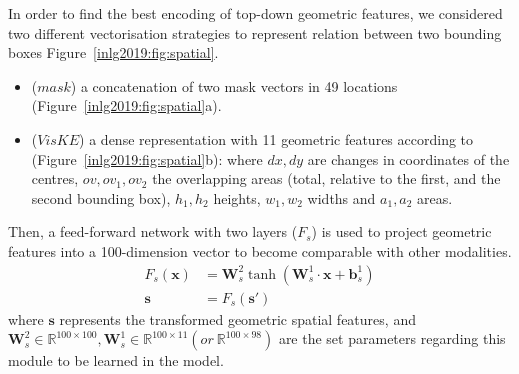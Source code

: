 In order to find the best encoding of top-down geometric features, we considered two different vectorisation strategies to represent relation between two bounding boxes Figure~\ref{inlg2019:fig:spatial}.
\begin{itemize}[noitemsep]
	\item ($mask$) a concatenation of two mask vectors in 49 locations (Figure~\ref{inlg2019:fig:spatial}a).
	\item ($VisKE$) a dense representation with 11 geometric features according to \cite{sadeghi2015viske}  (Figure~\ref{inlg2019:fig:spatial}b): where $dx, dy$ are changes in coordinates of the centres, $ov, ov_1, ov_2$ the overlapping areas (total, relative to the first, and the second bounding box), $h_1, h_2$ heights, $w_1, w_2$ widths and $a_1, a_2$ areas.
\end{itemize}
Then, a feed-forward network with two layers ($F_s$) is used to project geometric features into a 100-dimension vector to become comparable with other modalities. %
\begin{align*}
F_s(\bm{x}) &= \bm{W}_{s}^2 \tanh(\bm{W}_{s}^1 \cdot \bm{x} + \bm{b}_{s}^1) \\
\bm{s} &= F_s(\bm{s}')
\end{align*}
\noindent where $\bm{s}$ represents the transformed geometric spatial features, and $\bm{W}_{s}^2 \in \mathbb{R}^{100 \times 100}, \bm{W}_{s}^1 \in \mathbb{R}^{100 \times 11} (or~\mathbb{R}^{100 \times 98})$ are the set parameters regarding this module to be learned in the model. 



